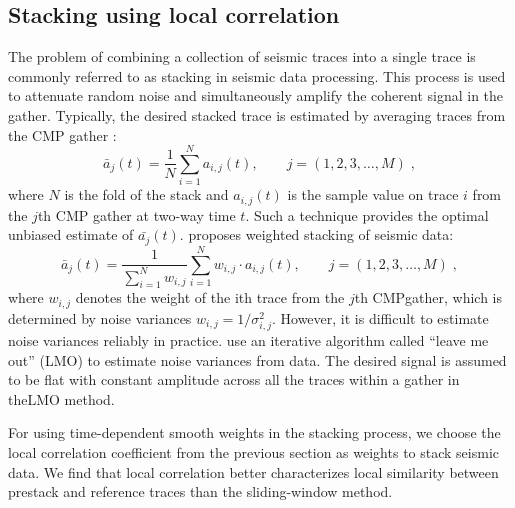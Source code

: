 \subsection{Stacking using local correlation}

The problem of combining a collection of seismic traces into a
single trace is commonly referred to as stacking in seismic data processing.
This process is used to attenuate random noise and simultaneously
amplify the coherent signal in the gather. Typically, the desired
stacked trace is estimated by averaging traces from the CMP
gather \cite[]{Mayne62}:
      \begin{equation}
          \bar{a}_j(t) = \frac{1}{N}\displaystyle\sum_{i=1}^{N} a_{i,j}(t), \qquad j=(1,2,3,\dots,M) \;,
        \label{eq:eq8}
      \end{equation}
where $N$ is the fold of the stack and $a_{i,j}(t)$ is the sample value on 
trace $i$ from the $j$th CMP gather at two-way time $t$. Such a technique 
provides the optimal unbiased estimate of $\bar{a_j}(t)$. \cite{Robinson70} 
proposes weighted stacking of seismic data:
      \begin{equation}
          \bar{a}_j(t) = \frac{1}{\displaystyle\sum_{i=1}^{N} w_{i,j}}\displaystyle\sum_{i=1}^{N} w_{i,j} \cdot a_{i,j}(t), \qquad j=(1,2,3,\dots,M) \;,
        \label{eq:eq9}
      \end{equation}
where $w_{i,j}$ denotes the weight of the ith trace from the $j$th CMPgather,
which is determined by noise variances $w_{i,j}=1/\sigma^2_{i,j}$. However, it
is difficult to estimate noise variances reliably in practice. 
\cite{Neelamani06} use an iterative algorithm called ``leave me out'' (LMO) to 
estimate noise variances from data. The desired signal is assumed to be flat 
with constant amplitude across all the traces within a gather in theLMO method.

For using time-dependent smooth weights in the stacking process, we choose the 
local correlation coefficient from the previous section as weights to stack 
seismic data. We find that local correlation better characterizes local 
similarity between prestack and reference traces than the sliding-window 
method.

